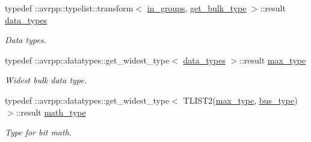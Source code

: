 \begin{DoxyCompactItemize}
typedef ::avrpp::typelist::transform$<$ \hyperlink{structavrpp_1_1bus_1_1input__bus_a5615071616dcadcc6d365c8b8354f537}{in\_\-groups}, \hyperlink{structavrpp_1_1bus_1_1get__bulk__type}{get\_\-bulk\_\-type} $>$::result \hyperlink{structavrpp_1_1bus_1_1input__bus_ac1c2ce93ef8e3f3408ea57355d8aa139}{data\_\-types}
\begin{DoxyCompactList}\small\item\em Data types. \item\end{DoxyCompactList}\item 
typedef ::avrpp::datatypes::get\_\-widest\_\-type$<$ \hyperlink{structavrpp_1_1bus_1_1input__bus_ac1c2ce93ef8e3f3408ea57355d8aa139}{data\_\-types} $>$::result \hyperlink{structavrpp_1_1bus_1_1input__bus_adb5d93a3e6b52dc72ad270be2d49e8be}{max\_\-type}
\begin{DoxyCompactList}\small\item\em Widest bulk data type. \item\end{DoxyCompactList}\item 
typedef ::avrpp::datatypes::get\_\-widest\_\-type$<$ TLIST2(\hyperlink{structavrpp_1_1bus_1_1input__bus_adb5d93a3e6b52dc72ad270be2d49e8be}{max\_\-type}, \hyperlink{structavrpp_1_1bus_1_1input__bus_aa1146b9861eb713a67224e329e4244a9}{bus\_\-type})$>$::result \hyperlink{structavrpp_1_1bus_1_1input__bus_a52d5d0ce7a0d4e34127230d80cfece76}{math\_\-type}
\begin{DoxyCompactList}\small\item\em Type for bit math. \item\end{DoxyCompactList}\end{DoxyCompactItemize}

